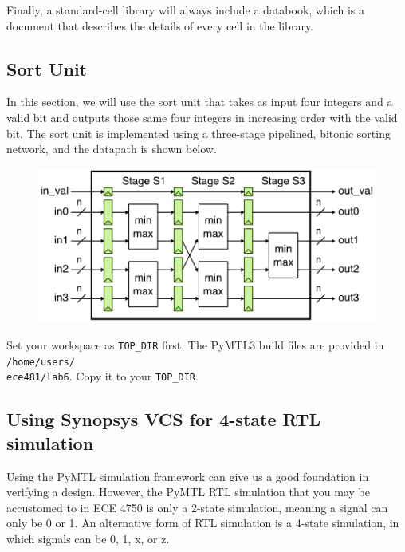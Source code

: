 \documentclass[a4paper,12pt,twoside]{article}
\begin{document}
Finally, a standard-cell library will always include a databook, which is a document that describes the details of every cell in the library.
\subsection{Sort Unit}
In this section, we will use the sort unit that takes as input four integers and a valid bit and outputs those same four integers in increasing order with the valid bit. The sort unit is implemented using a three-stage pipelined, bitonic sorting network, and the datapath is shown below.
\begin{figure}[H]
    \centering
    \includegraphics[width=\textwidth]{images/8.png}
\end{figure}
Set your workspace as \texttt{TOP\_DIR} first. The PyMTL3 build files are provided in \texttt{/home/users/\\
ece481/lab6}. Copy it to your \texttt{TOP\_DIR}.
\subsection{Using Synopsys VCS for 4-state RTL simulation}
Using the PyMTL simulation framework can give us a good foundation in verifying a design. However, the PyMTL RTL simulation that you may be accustomed to in ECE 4750 is only a 2-state simulation, meaning a signal can only be 0 or 1. An alternative form of RTL simulation is a 4-state simulation, in which signals can be 0, 1, x, or z.
\end{document}
